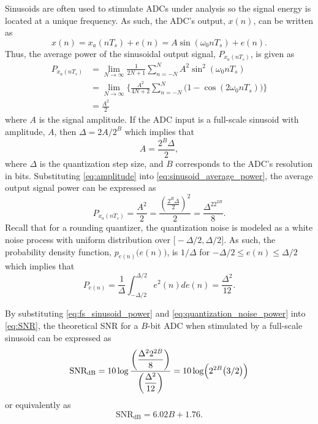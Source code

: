 Sinusoids are often used to stimulate ADCs under analysis so the signal energy is located
at a unique frequency. As such, the ADC's output, $x(n)$, can be written as $$x(n)=x_a(n
T_s) + e(n) = A \sin\left(\omega_0 n T_s\right)+e(n)\text{.}$$ Thus, the average power of
the
sinusoidal output signal, $P_{x_a(n T_s)}$, is given as
\begin{equation}\label{eq:sinusoid_average_power}
\begin{split}
P_{x_a(n T_s)}& =\lim_{N\to\infty}\frac{1}{2N+1}\sum_{n=-N}^{N}A^2\sin^2(\omega_0 n T_s)\\
& =
\lim_{N\to\infty}\Biggl\{\frac{A^2}{4N+2}\sum_{n=-N}^{N}\bigl(1-\cos(2\omega_0 n
T_s)\bigr)\Biggr\}\\
& = \frac{A^2}{2}
\end{split}
\end{equation}
where $A$ is the signal amplitude. If the ADC input is a full-scale sinusoid with
amplitude, $A$, then $\Delta=2A/2^B$ which implies that
\begin{equation}\label{eq:amplitude}
 A=\frac{2^B\Delta}{2},
\end{equation}
where $\Delta$ is the quantization step size, and $B$ corresponds to the ADC's resolution
in bits. Substituting \eqref{eq:amplitude} into \eqref{eq:sinusoid_average_power}, the
average output signal power can be expressed as
\begin{equation}\label{eq:fs_sinusoid_power}
 P_{x_a(n T_s)}=\frac{A^2}{2}=\frac{\left(\displaystyle\frac{2^B\Delta}{2}\right)^2}{2}
 =\frac{\Delta^22^{2B}}{8}\text{.}
\end{equation}
Recall that for a rounding quantizer, the quantization noise is modeled as a
white noise process with uniform distribution over $\bigl[-\Delta/2,\Delta
/2\bigr]$. As such, the probability density function, $p_{e(n)}\bigl(e(n)\bigr)$, is
$1/\Delta$ for $-\Delta/2\leq e(n)\leq\Delta/2$ which implies that
\begin{equation}\label{eq:quantization_noise_power}
 P_{e(n)}=\frac{1}{\Delta}\int_{-\Delta/2}^{\Delta/2}e^2(n)de(n)=\frac {\Delta^2}
{12}\text{.}
\end{equation}

By substituting \eqref{eq:fs_sinusoid_power} and \eqref{eq:quantization_noise_power} into
\eqref{eq:SNR}, the theoretical SNR for a $B$-bit ADC when stimulated by a full-scale
sinusoid can be expressed as
\begin{equation}\label{eq:theoretical_SNR}
 \text{SNR}_\text{dB}=
10\log\frac{\left(\displaystyle\frac{\Delta^22^{2B}}{8}\right)}{\left(\displaystyle\frac
{\Delta^2}
{12}\right)}
=10\log\Bigl(2^{2B}\bigl(3/2\bigr)\Bigr)
\end{equation}
or equivalently as
\begin{equation}\label{eq:theoretical_SNR_generalized}
 \text{SNR}_\text{dB}=6.02B+1.76\text{.}
\end{equation}

